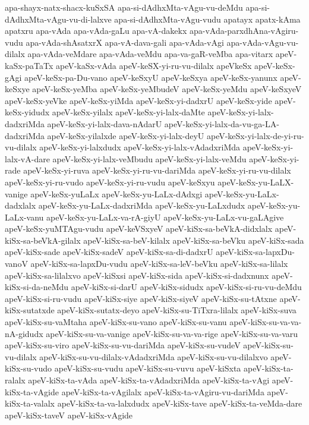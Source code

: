 {apa-shayx-natx-shacx-kuSxSA
apa-si-dAdhxMta-vAgu-vu-deMdu
apa-si-dAdhxMta-vAgu-vu-di-lalxve
apa-si-dAdhxMta-vAgu-vudu
apatayx
apatx-kAma
apatxru
apa-vAda
apa-vAda-gaLu
apa-vA-dakekx
apa-vAda-parxdhAna-vAgiru-vudu
apa-vAda-shAsatxrX
apa-vA-dava-gali
apa-vAda-vAgi
apa-vAda-vAgu-vu-dilalx
apa-vAda-veMdare
apa-vAda-veMdu
apa-va-gaR-veMba
apa-vitarx
apeV-kaSx-paTaTx
apeV-kaSx-vAda
apeV-keSX-yi-ru-vu-dilalx
apeVkeSx
apeV-keSx-gAgi
apeV-keSx-pa-Du-vano
apeV-keSxyU
apeV-keSxya
apeV-keSx-yanunx
apeV-keSxye
apeV-keSx-yeMba
apeV-keSx-yeMbudeV
apeV-keSx-yeMdu
apeV-keSxyeV
apeV-keSx-yeVke
apeV-keSx-yiMda
apeV-keSx-yi-dadxrU
apeV-keSx-yide
apeV-keSx-yidudx
apeV-keSx-yilalx
apeV-keSx-yi-lalx-daMte
apeV-keSx-yi-lalx-dadxriMda
apeV-keSx-yi-lalx-dava-nAdarU
apeV-keSx-yi-lalx-da-vu-ga-LA-dadxriMda
apeV-keSx-yilalxde
apeV-keSx-yi-lalx-deyU
apeV-keSx-yi-lalx-de-yi-ru-vu-dilalx
apeV-keSx-yi-lalxdudx
apeV-keSx-yi-lalx-vAdadxriMda
apeV-keSx-yi-lalx-vA-dare
apeV-keSx-yi-lalx-veMbudu
apeV-keSx-yi-lalx-veMdu
apeV-keSx-yi-rade
apeV-keSx-yi-ruva
apeV-keSx-yi-ru-vu-dariMda
apeV-keSx-yi-ru-vu-dilalx
apeV-keSx-yi-ru-vudo
apeV-keSx-yi-ru-vudu
apeV-keSxyu
apeV-keSx-yu-LaLX-vanige
apeV-keSx-yuLaLx
apeV-keSx-yu-LaLx-dAdxgi
apeV-keSx-yu-LaLx-dadxlalx
apeV-keSx-yu-LaLx-dadxriMda
apeV-keSx-yu-LaLxdudx
apeV-keSx-yu-LaLx-vanu
apeV-keSx-yu-LaLx-va-rA-giyU
apeV-keSx-yu-LaLx-vu-gaLAgive
apeV-keSx-yuMTAgu-vudu
apeV-keVSxyeV
apeV-kiSx-sa-beVkA-didxlalx
apeV-kiSx-sa-beVkA-gilalx
apeV-kiSx-sa-beV-kilalx
apeV-kiSx-sa-beVku
apeV-kiSx-sada
apeV-kiSx-sade
apeV-kiSx-sadeV
apeV-kiSx-sa-di-dadxrU
apeV-kiSx-sa-lapxDu-vanoV
apeV-kiSx-sa-lapxDu-vudu
apeV-kiSx-sa-leV-beVku
apeV-kiSx-sa-lilalx
apeV-kiSx-sa-lilalxvo
apeV-kiSxsi
apeV-kiSx-sida
apeV-kiSx-si-dadxnunx
apeV-kiSx-si-da-neMdu
apeV-kiSx-si-darU
apeV-kiSx-sidudx
apeV-kiSx-si-ru-vu-deMdu
apeV-kiSx-si-ru-vudu
apeV-kiSx-siye
apeV-kiSx-siyeV
apeV-kiSx-su-tAtxne
apeV-kiSx-sutatxde
apeV-kiSx-sutatx-deyo
apeV-kiSx-su-TiTxra-lilalx
apeV-kiSx-suva
apeV-kiSx-su-vaMtaha
apeV-kiSx-su-vano
apeV-kiSx-su-vanu
apeV-kiSx-su-va-va-nA-gidudx
apeV-kiSx-su-va-vanige
apeV-kiSx-su-va-va-rige
apeV-kiSx-su-va-varu
apeV-kiSx-su-viro
apeV-kiSx-su-vu-dariMda
apeV-kiSx-su-vudeV
apeV-kiSx-su-vu-dilalx
apeV-kiSx-su-vu-dilalx-vAdadxriMda
apeV-kiSx-su-vu-dilalxvo
apeV-kiSx-su-vudo
apeV-kiSx-su-vudu
apeV-kiSx-su-vuvu
apeV-kiSxta
apeV-kiSx-ta-ralalx
apeV-kiSx-ta-vAda
apeV-kiSx-ta-vAdadxriMda
apeV-kiSx-ta-vAgi
apeV-kiSx-ta-vAgide
apeV-kiSx-ta-vAgilalx
apeV-kiSx-ta-vAgiru-vu-dariMda
apeV-kiSx-ta-valalx
apeV-kiSx-ta-va-lalxdudx
apeV-kiSx-tave
apeV-kiSx-ta-veMda-dare
apeV-kiSx-taveV
apeV-kiSx-vAgide
}
